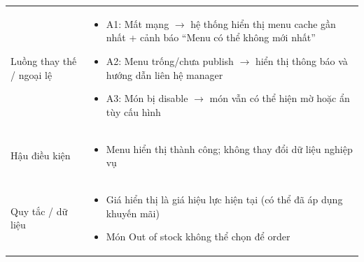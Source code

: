 \begin{longtable}{|>{\raggedright\arraybackslash}p{}|>{\raggedright\arraybackslash}p{}|}
\vspace{-0.5em}
\\
\hline
Luồng thay thế / ngoại lệ &
\vspace{-0.5em}
\begin{itemize}[leftmargin=*]
\item A1: Mất mạng $\rightarrow$ hệ thống hiển thị menu cache gần nhất + cảnh báo “Menu có thể không mới nhất”
\item A2: Menu trống/chưa publish $\rightarrow$ hiển thị thông báo và hướng dẫn liên hệ manager
\item A3: Món bị disable $\rightarrow$ món vẫn có thể hiện mờ hoặc ẩn tùy cấu hình
\end{itemize}
\vspace{-0.5em}
\\
\hline
Hậu điều kiện &
\vspace{-0.5em}
\begin{itemize}[leftmargin=*]
\item Menu hiển thị thành công; không thay đổi dữ liệu nghiệp vụ
\end{itemize}
\vspace{-0.5em}
\\
\hline
Quy tắc / dữ liệu &
\vspace{-0.5em}
\begin{itemize}[leftmargin=*]
\item Giá hiển thị là giá hiệu lực hiện tại (có thể đã áp dụng khuyến mãi)
\item Món Out of stock không thể chọn để order
\end{itemize}
\vspace{-0.5em}
\\
\hline
\end{longtable}

